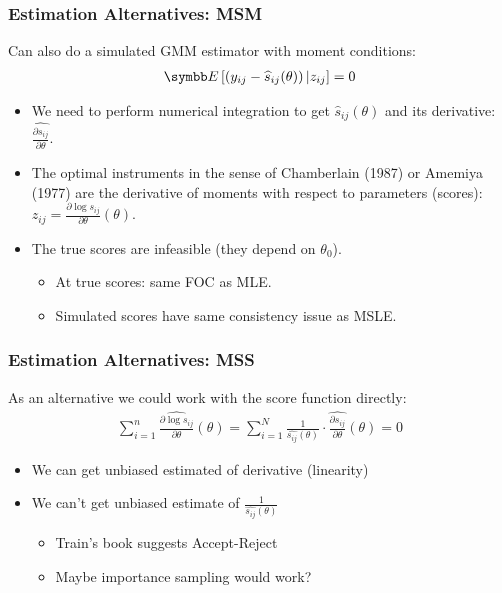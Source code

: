 \documentclass[aspectratio=169,11pt]{beamer}
\begin{document}
\begin{frame}
\frametitle{Estimation Alternatives: MSM}
Can also do a simulated GMM estimator with moment conditions:
\begin{align*}
\E\left[\left(y_{ij} - \widehat{s}_{ij}(\theta) \right) | z_{ij} \right]=0
\end{align*}
\begin{itemize}
\item We need to perform numerical integration to get $\widehat{s}_{ij}(\theta)$ and its derivative: $\widehat{\frac{\partial s_{ij}}{\partial \theta}}$.
\item The \alert{optimal instruments} in the sense of Chamberlain (1987) or Amemiya (1977) are the derivative of moments with respect to parameters (\alert{scores}): $z_{ij} = \frac{\partial \log s_{ij}}{\partial \theta}(\theta)$.
\item The true scores are infeasible (they depend on $\theta_0$).
\begin{itemize}
\item At true scores: same FOC as MLE.
\item Simulated scores have same consistency issue as MSLE.
\end{itemize}
\end{itemize}
\end{frame}


\begin{frame}
\frametitle{Estimation Alternatives: MSS}
As an alternative we could work with the score function directly:
\begin{align*}
\sum_{i=1}^n\widehat { \frac{\partial \log s_{ij}}{\partial \theta}}(\theta) =\sum_{i=1}^N \frac{1}{\widehat{s_{ij}}(\theta)} \cdot  \widehat{\frac{\partial s_{ij}}{\partial \theta}}(\theta) = 0
\end{align*}
\begin{itemize}
\item We can get unbiased estimated of derivative (linearity)
\item We can't get unbiased estimate of $\frac{1}{\widehat{s_{ij}}(\theta)}$
\begin{itemize}
\item Train's book suggests Accept-Reject 
\item Maybe importance sampling would work?
\end{itemize}
\end{itemize}
\end{frame}
\end{document}
